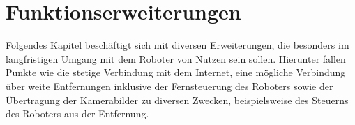 \section{Funktionserweiterungen}
\label{sec:funktionserweiterungen-und-integration}

Folgendes Kapitel beschäftigt sich mit diversen Erweiterungen, die besonders im langfristigen Umgang mit dem Roboter
von Nutzen sein sollen.
Hierunter fallen Punkte wie die stetige Verbindung mit dem Internet, eine mögliche Verbindung über weite Entfernungen
inklusive der Fernsteuerung des Roboters sowie der Übertragung der Kamerabilder zu diversen Zwecken, beispielsweise
des Steuerns des Roboters aus der Entfernung.





